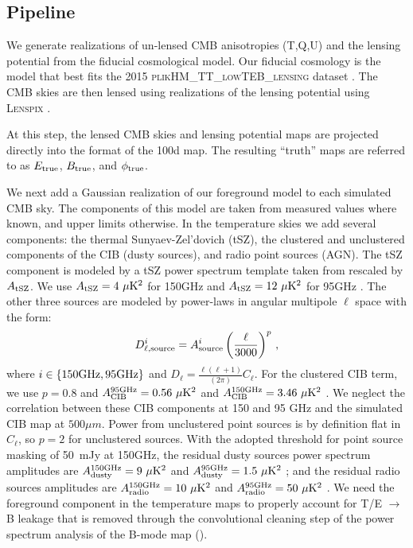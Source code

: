 \subsection{Pipeline}
\label{sec:sim_pipeline}
We generate realizations of un-lensed CMB anisotropies (T,Q,U) and the lensing potential from the fiducial cosmological model.
Our fiducial cosmology is the \LCDM model that best fits the 2015 \textsc{plikHM\_TT\_lowTEB\_lensing} dataset \citep{planck15-11}.
The CMB skies are then lensed using realizations of the lensing potential using \textsc{Lenspix} \citep{2005PhRvD..71j3010C}.

At this step, the lensed CMB skies and lensing potential maps are projected directly into the format of the 100d \sptpol map.
The resulting ``truth'' maps are referred to as $E_{\rm true}$, $B_{\rm true}$, and $\phi_{\rm true}$.

We next add a Gaussian realization of our foreground model to each simulated CMB sky.
The components of this model are taken from measured values where known, and upper limits otherwise.
In the temperature skies we add several components: the thermal Sunyaev-Zel'dovich (tSZ), the clustered and unclustered components of the CIB (dusty sources), and radio point sources (AGN).
The tSZ component is modeled by a tSZ power spectrum template taken from \cite{shaw10} rescaled by $A_{\rm tSZ}$.
We use $A_{\rm tSZ} = 4~\mu{\rm K}^2$ for 150GHz and $A_{\rm tSZ} = 12~\mu{\rm K}^2$ for 95GHz \citep{george14}.
The other three sources are modeled by power-laws in angular multipole $\ell$ space with the form:
\begin{equation*}
D_{\ell, \mathrm{source}}^{i}=  A^{i}_{\rm source}\left(\frac{\ell}{3000}\right)^{p} \,,
\end{equation*}
where $i\in\{150 \rm{GHz} ,95 \rm{GHz} \}$ and $D_{\ell} = \frac{\ell(\ell+1)}{(2\pi)}C_{\ell}$.
For the clustered CIB term, we use $p=0.8$ and  $A_{\rm{CIB}}^{95 \rm{GHz}} = 0.56~ \mu{\rm K}^2$ and $A_{\rm{CIB}}^{150 \rm{GHz}} = 3.46~ \mu{\rm K}^2$  \citep{george14}.
We neglect the correlation between these CIB components at 150 and 95 GHz and the simulated CIB map at $500 \mu m$.
Power from unclustered point sources is by definition flat in $C_{\ell}$, so $p=2$ for unclustered sources.
With the adopted threshold for point source masking of 50~mJy at 150GHz, the residual dusty sources power spectrum amplitudes are
$A_{\rm{dusty}}^{150 \rm{GHz}} = 9~\mu{\rm K}^2$ and $A_{\rm{dusty}}^{95 \rm{GHz}} = 1.5~\mu{\rm K}^2$ \citep{george14};
and the residual radio sources amplitudes are
$A_{\rm{radio}}^{150 \rm{GHz}} = 10~ \mu{\rm K}^2$ and $A_{\rm{radio}}^{95 \rm{GHz}} = 50~\mu{\rm K}^2$ \citep{mocanu13, george14}.
We need the foreground component in the temperature maps to properly account for T/E $\rightarrow$ B leakage that is removed through the convolutional cleaning step of the power spectrum analysis of the B-mode map ().

